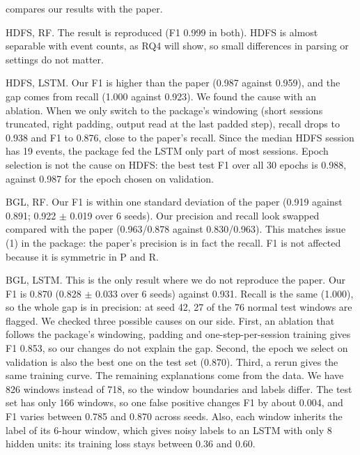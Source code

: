 \documentclass[10pt, conference]{IEEEtran}
\renewcommand{\paragraph}[1]{\noindent\textsf{#1}.}
\begin{document}
 compares our results with the paper.

\paragraph{HDFS, RF} The result is reproduced (F1 0.999 in both). HDFS is almost separable with event counts, as RQ4 will show, so small differences in parsing or settings do not matter.

\paragraph{HDFS, LSTM} Our F1 is higher than the paper (0.987 against 0.959), and the gap comes from recall (1.000 against 0.923). We found the cause with an ablation. When we only switch to the package's windowing (short sessions truncated, right padding, output read at the last padded step), recall drops to 0.938 and F1 to 0.876, close to the paper's recall. Since the median HDFS session has 19 events, the package fed the LSTM only part of most sessions. Epoch selection is not the cause on HDFS: the best test F1 over all 30 epochs is 0.988, against 0.987 for the epoch chosen on validation.

\paragraph{BGL, RF} Our F1 is within one standard deviation of the paper (0.919 against 0.891; 0.922 $\pm$ 0.019 over 6 seeds). Our precision and recall look swapped compared with the paper (0.963/0.878 against 0.830/0.963). This matches issue (1) in the package: the paper's precision is in fact the recall. F1 is not affected because it is symmetric in P and R.

\paragraph{BGL, LSTM} This is the only result where we do not reproduce the paper. Our F1 is 0.870 (0.828 $\pm$ 0.033 over 6 seeds) against 0.931. Recall is the same (1.000), so the whole gap is in precision: at seed 42, 27 of the 76 normal test windows are flagged. We checked three possible causes on our side. First, an ablation that follows the package's windowing, padding and one-step-per-session training gives F1 0.853, so our changes do not explain the gap. Second, the epoch we select on validation is also the best one on the test set (0.870). Third, a rerun gives the same training curve. The remaining explanations come from the data. We have 826 windows instead of 718, so the window boundaries and labels differ. The test set has only 166 windows, so one false positive changes F1 by about 0.004, and F1 varies between 0.785 and 0.870 across seeds. Also, each window inherits the label of its 6-hour window, which gives noisy labels to an LSTM with only 8 hidden units: its training loss stays between 0.36 and 0.60.
\end{document}
